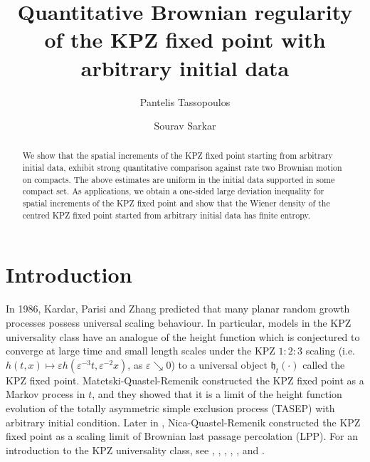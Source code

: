 \documentclass[11pt, reqno]{amsart}
\title{Quantitative Brownian regularity of the KPZ fixed point with arbitrary initial data}
\author{Pantelis Tassopoulos}
\author{Sourav Sarkar}
\numberwithin{equation}{section}
\begin{document}
\date{}

\begin{abstract}
We show that the spatial increments of the KPZ fixed point starting from arbitrary initial data, exhibit strong quantitative comparison against rate two Brownian motion on compacts. The above estimates are uniform in the initial data supported in some compact set. 
As applications, we obtain a one-sided large deviation inequality for spatial increments of the KPZ fixed point and show that the Wiener density of the centred KPZ fixed point started from arbitrary initial data has finite entropy.
\color{black}
\end{abstract}

\maketitle

\tableofcontents

\section{Introduction}\label{intro}

In 1986, Kardar, Parisi and Zhang \cite{kardar1986dynamic} predicted that many planar random growth processes possess universal scaling behaviour. In particular, models in the KPZ universality class have an analogue of the height function which is conjectured to converge at large time and small length scales under the KPZ $1:2:3$ scaling (i.e. $h(t, x)\mapsto \varepsilon h(\varepsilon^{-3}t, \varepsilon^{-2}x)$, as $\varepsilon \searrow 0$) to a universal object $\mathfrak{h}_t(\cdot)$ called the KPZ fixed point. Matetski-Quastel-Remenik \cite{matetski2016kpz} constructed the KPZ fixed point as a Markov process in $t$, and they showed that it is a limit of the height function evolution of the totally asymmetric simple exclusion process (TASEP) with arbitrary initial condition. Later in \cite{nica2020one}, Nica-Quastel-Remenik constructed the KPZ fixed point as a scaling limit of Brownian last passage percolation (LPP). For an introduction to the KPZ universality class, see \cite{quastel2011introduction}, \cite{ferrari2010random}, \cite{romik2015surprising}, \cite{corwin2016kardar}, \cite{weiss2017reflected}, \cite{ganguly2021random} and \cite{ZygourasalgKPZ}.
\end{document}
